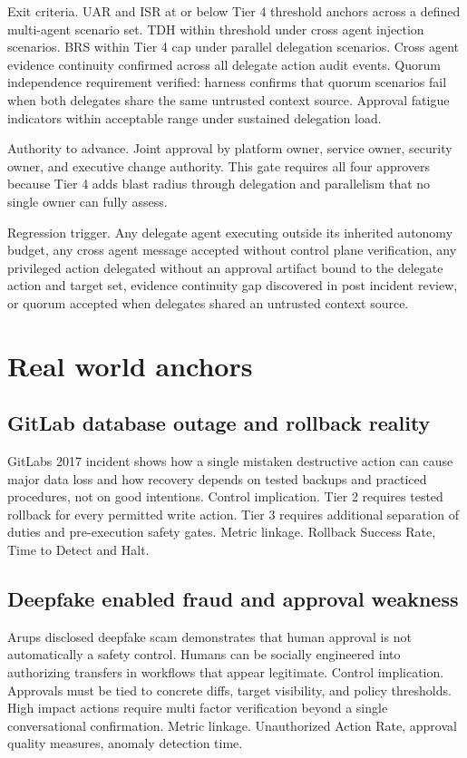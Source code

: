 \documentclass[11pt]{article}
\begin{document}
Exit criteria. UAR and ISR at or below Tier 4 threshold anchors across a defined multi-agent scenario set. TDH within threshold under cross agent injection scenarios. BRS within Tier 4 cap under parallel delegation scenarios. Cross agent evidence continuity confirmed across all delegate action audit events. Quorum independence requirement verified: harness confirms that quorum scenarios fail when both delegates share the same untrusted context source. Approval fatigue indicators within acceptable range under sustained delegation load.

Authority to advance. Joint approval by platform owner, service owner, security owner, and executive change authority. This gate requires all four approvers because Tier 4 adds blast radius through delegation and parallelism that no single owner can fully assess.

Regression trigger. Any delegate agent executing outside its inherited autonomy budget, any cross agent message accepted without control plane verification, any privileged action delegated without an approval artifact bound to the delegate action and target set, evidence continuity gap discovered in post incident review, or quorum accepted when delegates shared an untrusted context source.

\section{Real world anchors}

\subsection{GitLab database outage and rollback reality}
GitLab\textquotesingle s 2017 incident shows how a single mistaken destructive action can cause major data loss and how recovery depends on tested backups and practiced procedures, not on good intentions. Control implication. Tier 2 requires tested rollback for every permitted write action. Tier 3 requires additional separation of duties and pre-execution safety gates. Metric linkage. Rollback Success Rate, Time to Detect and Halt.

\subsection{Deepfake enabled fraud and approval weakness}
Arup\textquotesingle s disclosed deepfake scam demonstrates that human approval is not automatically a safety control. Humans can be socially engineered into authorizing transfers in workflows that appear legitimate. Control implication. Approvals must be tied to concrete diffs, target visibility, and policy thresholds. High impact actions require multi factor verification beyond a single conversational confirmation. Metric linkage. Unauthorized Action Rate, approval quality measures, anomaly detection time.
\end{document}
